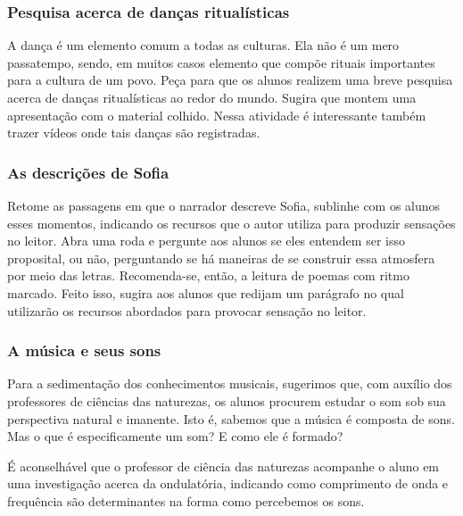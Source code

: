\documentclass[12pt]{extarticle}
\begin{document}
\subsubsection{Pesquisa acerca de danças ritualísticas}


A dança é um elemento comum a todas as culturas. Ela não é um mero passatempo, sendo, em muitos casos elemento que
compõe rituais importantes para a cultura de um povo. Peça para que os
alunos realizem uma breve pesquisa acerca de danças ritualísticas ao
redor do mundo. Sugira que montem uma apresentação com o material
colhido. Nessa atividade é interessante também trazer vídeos onde tais danças são registradas.


\subsubsection{As descrições de Sofia}

  Retome as passagens em que o narrador descreve Sofia, sublinhe com os
  alunos esses momentos, indicando os recursos que o autor utiliza para
  produzir sensações no leitor. Abra uma roda e pergunte aos alunos se
  eles entendem ser isso proposital, ou não, perguntando se há maneiras
  de se construir essa atmosfera por meio das letras. Recomenda-se,
  então, a leitura de poemas com ritmo marcado. Feito isso, sugira aos
  alunos que redijam um parágrafo no qual utilizarão os recursos
  abordados para provocar sensação no leitor.


\subsubsection{A música e seus sons}

Para a sedimentação dos conhecimentos musicais, sugerimos que, com auxílio dos professores de ciências das naturezas, os alunos procurem estudar o som sob sua perspectiva natural e imanente. Isto é, sabemos que a música é composta de sons. Mas o que é especificamente um som? E como ele é formado?

É aconselhável que o professor de ciência das naturezas acompanhe o aluno em uma investigação acerca da ondulatória, indicando como comprimento de onda e frequência são determinantes na forma como percebemos os sons.
\end{document}
